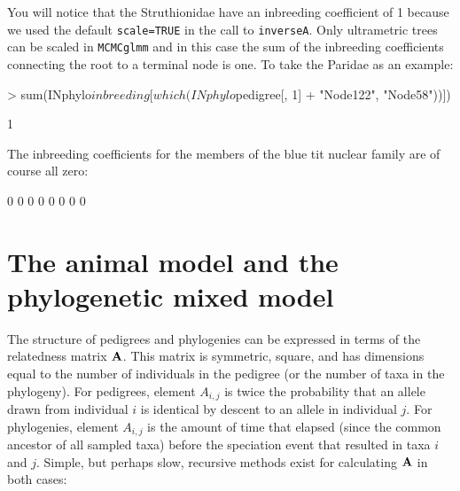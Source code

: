 \documentclass{article}
\begin{document}
You will notice that the Struthionidae have an inbreeding coefficient of 1 because we used the default \texttt{scale=TRUE} in the call to \texttt{inverseA}.  Only ultrametric trees can be scaled in \texttt{MCMCglmm} and in this case the sum of the inbreeding coefficients connecting the root to a terminal node is one. To take the Paridae as an example:

\begin{Schunk}
\begin{Sinput}
> sum(INphylo$inbreeding[which(INphylo$pedigree[, 1] %
+     "Node122", "Node58"))])
\end{Sinput}
\begin{Soutput}
[1] 1
\end{Soutput}
\end{Schunk}

The inbreeding coefficients for the members of the blue tit nuclear family are of course all zero:

\begin{Schunk}
\begin{Soutput}
[1] 0 0 0 0 0 0 0 0
\end{Soutput}
\end{Schunk}

\section{The animal model and the phylogenetic mixed model}

The structure of pedigrees and phylogenies can be expressed in terms of the relatedness matrix  ${\bf A}$. This matrix is symmetric, square, and has dimensions equal to the number of individuals in the pedigree (or the number of taxa in the phylogeny). For pedigrees, element $A_{i,j}$ is twice the probability that an allele drawn from individual $i$ is identical by descent to an allele in individual $j$.  For phylogenies, element $A_{i,j}$ is the amount of time that elapsed (since the common ancestor of all sampled taxa) before the speciation event that resulted in taxa $i$ and $j$. Simple, but perhaps slow, recursive methods exist for calculating  ${\bf A}$ in both cases:
\end{document}
